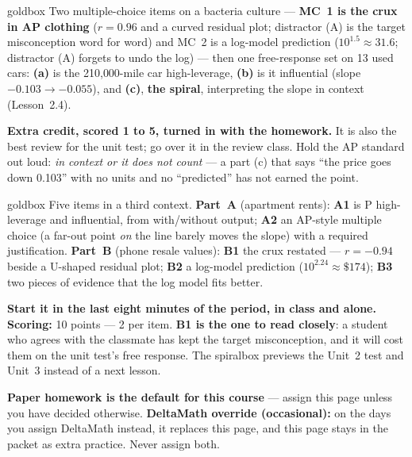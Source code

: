 \documentclass[10pt]{article}
\begin{document}
\boxguard
\begin{skillbox}{goldbox}
Two multiple-choice items on a bacteria culture --- \textbf{MC~1 is the crux in AP clothing}
($r = 0.96$ and a curved residual plot; distractor (A) is the target misconception word for
word) and MC~2 is a log-model prediction ($10^{1.5} \approx 31.6$; distractor (A) forgets to
undo the log) --- then one free-response set on 13 used cars: \textbf{(a)} is the
210{,}000-mile car high-leverage, \textbf{(b)} is it influential (slope $-0.103 \to -0.055$),
and \textbf{(c)}, \textbf{the spiral}, interpreting the slope in context (Lesson~2.4).

\textbf{Extra credit, scored 1 to 5, turned in with the homework.} It is also the
best review for the unit test; go over it in the review class. Hold the AP standard out loud:
\emph{in context or it does not count} --- a part (c) that says ``the price goes down 0.103''
with no units and no ``predicted'' has not earned the point.
\end{skillbox}

\boxguard
\begin{skillbox}{goldbox}
Five items in a third context. \textbf{Part~A} (apartment rents): \textbf{A1} is P high-leverage
and influential, from with/without output; \textbf{A2} an AP-style multiple choice (a far-out
point \emph{on} the line barely moves the slope) with a required justification. \textbf{Part~B}
(phone resale values): \textbf{B1} the crux restated --- $r = -0.94$ beside a U-shaped
residual plot; \textbf{B2} a log-model prediction ($10^{2.24} \approx \$174$); \textbf{B3} two
pieces of evidence that the log model fits better.

\textbf{Start it in the last eight minutes of the period, in class and alone.}
\textbf{Scoring:} 10 points --- 2 per item. \textbf{B1 is the one to read closely}: a student
who agrees with the classmate has kept the target misconception, and it will cost them on the
unit test's free response. The spiralbox previews the Unit~2 test and Unit~3 instead of a next
lesson.

\textbf{Paper homework is the default for this course} --- assign this page unless you have
decided otherwise. \textbf{DeltaMath override (occasional):} on the days you assign DeltaMath
instead, it replaces this page, and this page
stays in the packet as extra practice. Never assign both.
\end{skillbox}
\end{document}
